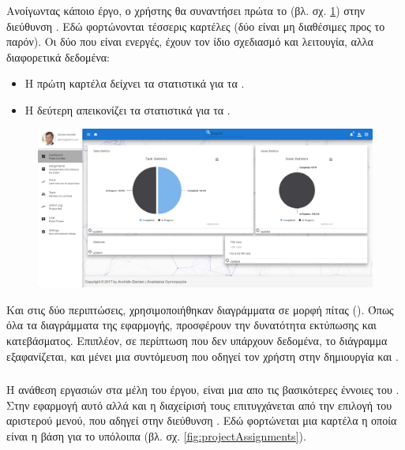 \subsubsection*{}
\pSpace Ανοίγωντας κάποιο έργο, ο χρήστης θα συναντήσει πρώτα το  (βλ. σχ. \ref{fig:projectDashboard}) στην διεύθυνση . Εδώ φορτώνονται τέσσερις καρτέλες (δύο είναι μη διαθέσιμες προς το παρόν). Οι δύο που είναι ενεργές, έχουν τον ίδιο σχεδιασμό και λειτουγία, αλλα διαφορετικά δεδομένα:
\begin{itemize}
	\item Η πρώτη καρτέλα δείχνει τα στατιστικά για τα .
	\item Η δεύτερη απεικονίζει τα στατιστικά για τα .
\end{itemize}

\begin{figure}[!htb]
\includegraphics[width=\linewidth]{images/projectDashboard.png}
\caption{}
\label{fig:projectDashboard}
\end{figure}

\pSpace Και στις δύο περιπτώσεις, χρησιμοποιήθηκαν διαγράμματα σε μορφή πίτας (). Όπως όλα τα διαγράμματα της εφαρμογής, προσφέρουν την δυνατότητα εκτύπωσης και κατεβάσματος. Επιπλέον, σε περίπτωση που δεν υπάρχουν δεδομένα, το διάγραμμα εξαφανίζεται, και μένει μια συντόμευση που οδηγεί τον χρήστη στην δημιουργία  και .

\pagebreak

\subsubsection*{}
\pSpace Η ανάθεση εργασιών στα μέλη του έργου, είναι μια απο τις βασικότερες έννοιες του . Στην εφαρμογή  αυτό αλλά και η διαχείρισή τους επιτυγχάνεται από την επιλογή  του αριστερού μενού, που αδηγεί στην διεύθυνση . Εδώ φορτώνεται μια καρτέλα η οποία είναι η βάση για το υπόλοιπα (βλ. σχ. \ref{fig:projectAssignments}).

